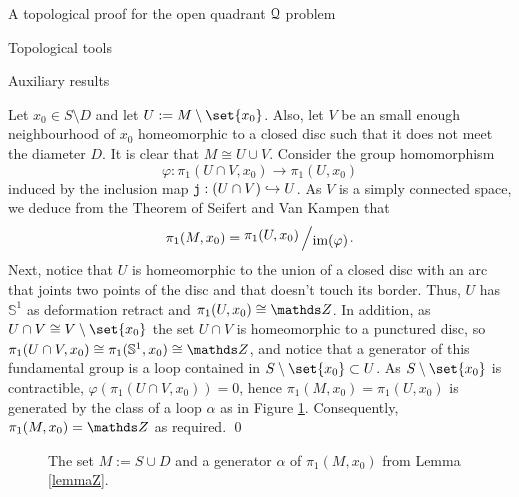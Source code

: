 \documentclass[11pt, a4paper, english, twoside, notitlepage, openright]{report}
\begin{document}
\begin{chapter}{A topological proof for the open quadrant $\mathcal{Q}$ problem}
\begin{section}{Topological tools}
\begin{subsection}{Auxiliary results}
\begin{lemma}
\begin{Proof}
Let $x_0\in S\setminus D$ and let $U := M\setminus\set{x_0}$. Also, let $V$ be an small enough  neighbourhood of $x_0$ homeomorphic to a closed disc such that it does not meet the diameter $D$. It is clear that $M\cong U\cup V$. Consider  the group homomorphism
$$
\varphi:\pi_1(U\cap V,x_0)\to\pi_1(U,x_0)
$$
induced by the inclusion map ${\tt j}: (U\cap V)\hookrightarrow U$. As $V$ is a simply connected space, we deduce from the Theorem of Seifert and Van Kampen \cite[Chapter IV: $\mathsection$4, page 95]{m} that 
$$
\pi_1(M,x_0)=\bigslant{\pi_1(U,x_0)}{\text{im}(\varphi)}.
$$
Next, notice that $U$ is homeomorphic to the union of a closed disc with an arc that joints two points of the disc and that doesn't touch its border. Thus, $U$ has $\mathbb{S}^1$ as deformation retract and $\pi_1(U, x_0)\cong \Z$. In addition, as $U\cap V\cong V\setminus\set{x_0}$ the set $U\cap V$ is homeomorphic to a punctured disc, so $\pi_1(U\cap V, x_0)\cong \pi_1(\mathbb{S}^1,x_0) \cong \Z$, and notice that a generator of this fundamental group is a loop contained  in $S\setminus\set{x_0}\subset U$. As $S\setminus\set{x_0}$ is contractible, $\varphi(\pi_1(U\cap V, x_0))=0$, hence $\pi_1(M, x_0) = \pi_1(U, x_0)$ is generated by the class of a loop $\alpha$ as in Figure \ref{fig:sphereZ}. Consequently, $\pi_1(M, x_0)=\Z$ as required.
\qed
\end{Proof}
\end{lemma}

\begin{figure}[h]
\begin{center}
\caption{The set $M:=S\cup D$ and a generator $\alpha$ of $\pi_1(M,x_0)$ from Lemma \ref{lemmaZ}.}\label{fig:sphereZ}
\end{center}
\end{figure}


\end{subsection}
\end{section}
\end{chapter}
\end{document}
